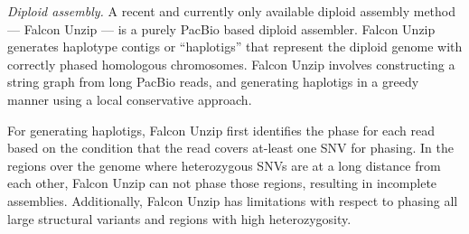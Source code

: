 \textit{Diploid assembly.} A recent and currently only available diploid assembly method --- Falcon Unzip \citep{chin2016phased} --- is a purely PacBio based diploid assembler.
Falcon Unzip generates haplotype contigs or ``haplotigs'' that represent the diploid genome with correctly phased homologous chromosomes.
Falcon Unzip involves constructing a string graph from long PacBio reads, and generating haplotigs in a greedy manner using a local conservative approach.


For generating haplotigs, Falcon Unzip first identifies the phase for each read based on the condition that the read covers at-least one SNV for phasing.
In the regions over the genome where heterozygous SNVs are at a long distance from each other, Falcon Unzip can not phase those regions, resulting in incomplete assemblies.
Additionally, Falcon Unzip has limitations with respect to phasing all large structural variants and regions with high heterozygosity. 

% 

